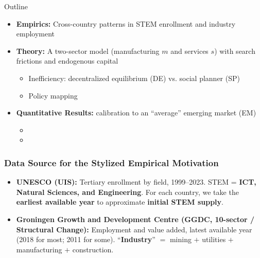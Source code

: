 \documentclass[9pt,xcolor={svgnames}]{beamer}
\begin{document}
\begin{frame}{Outline}
\begin{itemize}
    \item \textbf{Empirics:}  
    Cross-country patterns in STEM enrollment and industry employment

    \medskip

    \item \textbf{Theory:}  
    A two-sector model (manufacturing $m$ and services $s$) 
    with search frictions and endogenous capital

    \medskip

    \begin{itemize}
        \item Inefficiency: decentralized equilibrium (DE) vs. social planner (SP)
        \vspace{2mm}
        \item Policy mapping 
    \end{itemize}

    \medskip

    \item \textbf{Quantitative Results:}  
    calibration to an “average” emerging market (EM)

       \begin{itemize}
        \item 
        \item 
    \end{itemize}

    
\end{itemize}
\end{frame}


\begin{frame}
\frametitle{Data Source for the Stylized Empirical Motivation}
\begin{itemize}

\item \textbf{UNESCO (UIS):} Tertiary enrollment by field, 1999–2023. 
STEM = \textbf{ICT, Natural Sciences, and Engineering}.  
For each country, we take the \textbf{earliest available year} to approximate \textbf{initial STEM supply}.

\medskip

\item \textbf{Groningen Growth and Development Centre (GGDC, 10-sector / Structural Change):} 
Employment and value added, latest available year (2018 for most; 2011 for some).  
“\textbf{Industry}” $=$ mining $+$ utilities $+$ manufacturing $+$ construction.

\end{itemize}
\end{frame}
\end{document}
